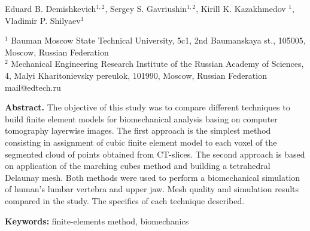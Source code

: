 \thispagestyle{empty}
{}

\vspace{5mm}

\begin{center} Eduard B. Demishkevich$^{1,2}$, Sergey S. Gavriushin$^{1,2}$, Kirill K. Kazakhmedov $^{1}$, Vladimir P. Shilyaev$^{1}$  \\

\vspace{5mm}

{\small $^{1}$ Bauman Moscow State Technical University, 5c1, 2nd Baumanskaya st., 105005, Moscow, Russian Federation \\
$^{2}$ Mechanical Engineering Research Institute of the Russian Academy of Sciences, 4, Malyi Kharitonievsky pereulok, 101990, Moscow, Russian Federation \\
mail@edtech.ru }
\end{center}

\begin{changemargin}{0.5cm}{0.5cm}
{\small \textbf{Abstract.} The objective of this study was to compare different techniques to build finite element models for biomechanical analysis
basing on computer tomography layerwise images. The first approach is the simplest method consisting in assignment of cubic finite element
model to each voxel of the segmented cloud of points obtained from CT-slices. The second approach is based on application of the marching
cubes method and building a tetrahedral Delaunay mesh. Both methods were used to perform a biomechanical simulation of human's lumbar vertebra and upper jaw.
Mesh quality and simulation results compared in the study. The specifics of each technique described.}

{\small \textbf{Keywords:} finite-elements method, biomechanics}

\end{changemargin}










